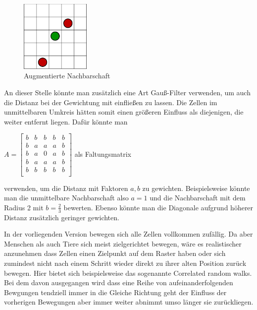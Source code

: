 \documentclass[10pt,twocolumn]{scrartcl}
\begin{document}
\begin{figure}[H]
	\centering
	\includegraphics[width= 0.3\textwidth]{./images/ewNachbar.pdf}
	\caption{Augmentierte Nachbarschaft}
	\label{fig:ewnachbar}
\end{figure}
An dieser Stelle könnte man zusätzlich eine Art Gauß-Filter verwenden, um auch die Distanz bei der Gewichtung mit einfließen zu lassen. Die Zellen im unmittelbaren Umkreis hätten somit einen größeren Einfluss als diejenigen, die weiter entfernt liegen.
Dafür könnte man 
\begin{center}
 $A = 
\begin{bmatrix}
b & b & b & b & b \\
b & a & a & a & b \\
b & a & 0 & a & b \\
b & a & a & a & b \\
b & b & b & b & b \\
\end{bmatrix}
$ als Faltungsmatrix
\end{center} verwenden, um die Distanz mit Faktoren $a,b$ zu gewichten. Beispielsweise könnte man die unmittelbare Nachbarschaft also $a=1$ und die Nachbarschaft mit dem Radius 2 mit $b=\frac{2}{3}$ bewerten. Ebenso könnte man die Diagonale aufgrund höherer Distanz zusätzlich geringer gewichten.

In der vorliegenden Version bewegen sich alle Zellen vollkommen zufällig. Da aber Menschen als auch Tiere sich meist zielgerichtet bewegen, wäre es realistischer anzunehmen dass Zellen einen Zielpunkt auf dem Raster haben oder sich zumindest nicht nach einem Schritt wieder direkt zu ihrer alten Position zurück bewegen. Hier bietet sich beispielsweise das sogenannte \glqq{}Correlated random walks\grqq{}. Bei dem davon ausgegangen wird dass eine Reihe von aufeinanderfolgenden Bewgungen tendziell immer in die Gleiche Richtung geht der Einfluss der vorherigen Bewegungen aber immer weiter abnimmt umso länger sie zurückliegen\cite{Codling:2008}.
\end{document}
